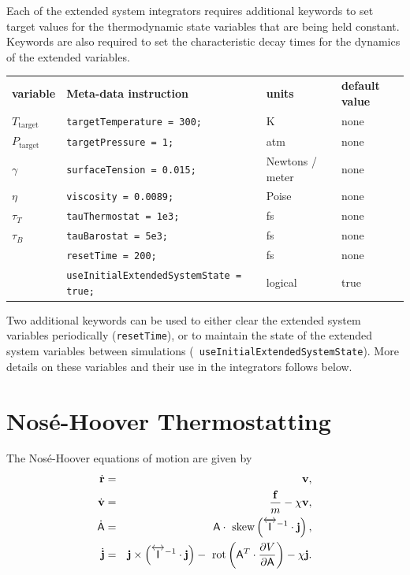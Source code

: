 \documentclass[]{book}
\begin{document}
Each of the extended system integrators requires additional keywords
to set target values for the thermodynamic state variables that are
being held constant.  Keywords are also required to set the
characteristic decay times for the dynamics of the extended
variables.

\begin{center}
\begin{tabular}{llll}
{\bf variable} & {\bf Meta-data instruction} & {\bf units} & {\bf
default value} \\  
$T_{\mathrm{target}}$ & {\tt targetTemperature = 300;} &  K & none \\
$P_{\mathrm{target}}$ & {\tt targetPressure = 1;} & atm & none \\
$\gamma$ & {\tt surfaceTension = 0.015;} & Newtons / meter & none \\
$\eta$ & {\tt viscosity = 0.0089;} & Poise & none \\
$\tau_T$ & {\tt tauThermostat = 1e3;} & fs & none \\
$\tau_B$ & {\tt tauBarostat = 5e3;} & fs  & none \\
         & {\tt resetTime = 200;} & fs & none \\
         & {\tt useInitialExtendedSystemState = true;} & logical &
true
\end{tabular}
\end{center}

Two additional keywords can be used to either clear the extended
system variables periodically ({\tt resetTime}), or to maintain the
state of the extended system variables between simulations ({\tt
useInitialExtendedSystemState}).  More details on these variables
and their use in the integrators follows below.

\section{\label{section:noseHooverThermo}Nos\'{e}-Hoover Thermostatting}

The Nos\'e-Hoover equations of motion are given by\cite{Hoover85}
\begin{eqnarray}
\dot{{\bf r}} & = & {\bf v}, \\
\dot{{\bf v}} & = & \frac{{\bf f}}{m} - \chi {\bf v} ,\\
\dot{\mathsf{A}} & = & \mathsf{A} \cdot
\mbox{ skew}\left(\overleftrightarrow{\mathsf{I}}^{-1} \cdot {\bf j}\right), \\
\dot{{\bf j}} & = & {\bf j} \times \left( \overleftrightarrow{\mathsf{I}}^{-1}
\cdot {\bf j} \right) - \mbox{ rot}\left(\mathsf{A}^{T} \cdot \frac{\partial
V}{\partial \mathsf{A}} \right) - \chi {\bf j}.
\label{eq:nosehoovereom}
\end{eqnarray}
\end{document}
